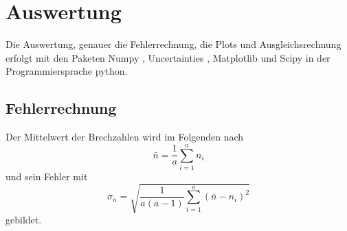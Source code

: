 \section{Auswertung}
Die Auswertung, genauer die Fehlerrechnung, die Plots und Ausgleichsrechnung erfolgt mit den Paketen
Numpy \cite{numpy}, Uncertainties \cite{uncertainties}, Matplotlib \cite{matplotlib} und Scipy \cite{scipy} in der Programmiersprache python.
\subsection{Fehlerrechnung}
Der Mittelwert der Brechzahlen wird im Folgenden nach
\begin{equation}
  \bar{n}=\frac{1}{a}\sum_{i=1}^{a}n_i
\end{equation}
und sein Fehler mit
\begin{equation}
  \sigma_{\bar{n}}=\sqrt{\frac{1}{a(a-1)}\sum_{i=1}^{a}(\bar{n}-n_i)^2}
\end{equation}
gebildet.
